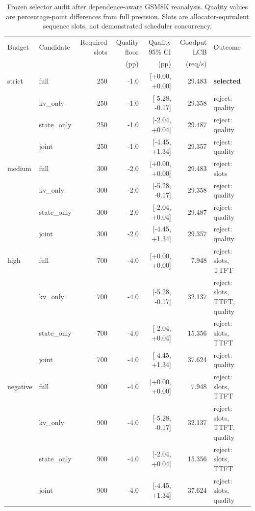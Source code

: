 \begin{table}[t]
\centering
\caption{Frozen selector audit after dependence-aware GSM8K reanalysis. Quality values are percentage-point differences from full precision. Slots are allocator-equivalent sequence slots, not demonstrated scheduler concurrency.}
\label{tab:selector-audit}
\small
\setlength{\tabcolsep}{3.5pt}
\begin{tabular}{llrrrrl}
\toprule
Budget & Candidate & Required slots & Quality floor & Quality 95\% CI & Goodput LCB & Outcome \\
 & & & (pp) & (pp) & (req/s) & \\
\midrule
strict & full & 250 & -1.0 & [+0.00, +0.00] & 29.483 & \textbf{selected} \\
 & kv\_only & 250 & -1.0 & [-5.28, -0.17] & 29.358 & reject: quality \\
 & state\_only & 250 & -1.0 & [-2.04, +0.04] & 29.487 & reject: quality \\
 & joint & 250 & -1.0 & [-4.45, +1.34] & 29.357 & reject: quality \\
\addlinespace[2pt]
medium & full & 300 & -2.0 & [+0.00, +0.00] & 29.483 & reject: slots \\
 & kv\_only & 300 & -2.0 & [-5.28, -0.17] & 29.358 & reject: quality \\
 & state\_only & 300 & -2.0 & [-2.04, +0.04] & 29.487 & reject: quality \\
 & joint & 300 & -2.0 & [-4.45, +1.34] & 29.357 & reject: quality \\
\addlinespace[2pt]
high & full & 700 & -4.0 & [+0.00, +0.00] & 7.948 & reject: slots, TTFT \\
 & kv\_only & 700 & -4.0 & [-5.28, -0.17] & 32.137 & reject: slots, TTFT, quality \\
 & state\_only & 700 & -4.0 & [-2.04, +0.04] & 15.356 & reject: slots, TTFT \\
 & joint & 700 & -4.0 & [-4.45, +1.34] & 37.624 & reject: quality \\
\addlinespace[2pt]
negative & full & 900 & -4.0 & [+0.00, +0.00] & 7.948 & reject: slots, TTFT \\
 & kv\_only & 900 & -4.0 & [-5.28, -0.17] & 32.137 & reject: slots, TTFT, quality \\
 & state\_only & 900 & -4.0 & [-2.04, +0.04] & 15.356 & reject: slots, TTFT \\
 & joint & 900 & -4.0 & [-4.45, +1.34] & 37.624 & reject: slots, quality \\
\bottomrule
\end{tabular}
\end{table}

